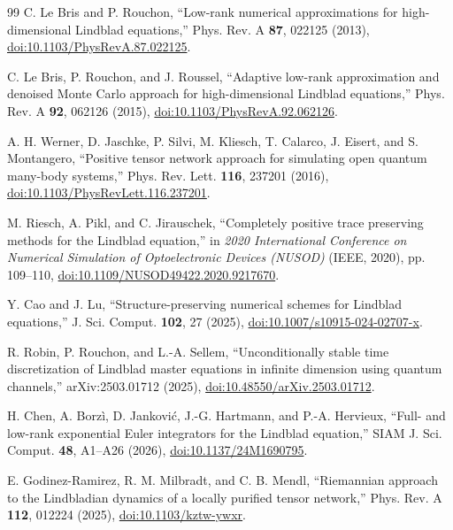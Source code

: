 \begin{thebibliography}{99}
C. Le Bris and P. Rouchon, ``Low-rank numerical approximations for high-dimensional Lindblad equations,'' Phys. Rev. A \textbf{87}, 022125 (2013), \href{https://doi.org/10.1103/PhysRevA.87.022125}{doi:10.1103/PhysRevA.87.022125}.

C. Le Bris, P. Rouchon, and J. Roussel, ``Adaptive low-rank approximation and denoised Monte Carlo approach for high-dimensional Lindblad equations,'' Phys. Rev. A \textbf{92}, 062126 (2015), \href{https://doi.org/10.1103/PhysRevA.92.062126}{doi:10.1103/PhysRevA.92.062126}.

A. H. Werner, D. Jaschke, P. Silvi, M. Kliesch, T. Calarco, J. Eisert, and S. Montangero, ``Positive tensor network approach for simulating open quantum many-body systems,'' Phys. Rev. Lett. \textbf{116}, 237201 (2016), \href{https://doi.org/10.1103/PhysRevLett.116.237201}{doi:10.1103/PhysRevLett.116.237201}.

M. Riesch, A. Pikl, and C. Jirauschek, ``Completely positive trace preserving methods for the Lindblad equation,'' in \textit{2020 International Conference on Numerical Simulation of Optoelectronic Devices (NUSOD)} (IEEE, 2020), pp. 109--110, \href{https://doi.org/10.1109/NUSOD49422.2020.9217670}{doi:10.1109/NUSOD49422.2020.9217670}.

Y. Cao and J. Lu, ``Structure-preserving numerical schemes for Lindblad equations,'' J. Sci. Comput. \textbf{102}, 27 (2025), \href{https://doi.org/10.1007/s10915-024-02707-x}{doi:10.1007/s10915-024-02707-x}.

R. Robin, P. Rouchon, and L.-A. Sellem, ``Unconditionally stable time discretization of Lindblad master equations in infinite dimension using quantum channels,'' arXiv:2503.01712 (2025), \href{https://doi.org/10.48550/arXiv.2503.01712}{doi:10.48550/arXiv.2503.01712}.

H. Chen, A. Borz\`i, D. Jankovi\'c, J.-G. Hartmann, and P.-A. Hervieux, ``Full- and low-rank exponential Euler integrators for the Lindblad equation,'' SIAM J. Sci. Comput. \textbf{48}, A1--A26 (2026), \href{https://doi.org/10.1137/24M1690795}{doi:10.1137/24M1690795}.

E. Godinez-Ramirez, R. M. Milbradt, and C. B. Mendl, ``Riemannian approach to the Lindbladian dynamics of a locally purified tensor network,'' Phys. Rev. A \textbf{112}, 012224 (2025), \href{https://doi.org/10.1103/kztw-ywxr}{doi:10.1103/kztw-ywxr}.


\end{thebibliography}
